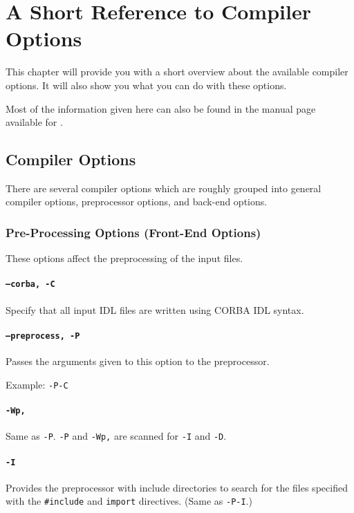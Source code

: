 \chapter{A Short Reference to Compiler Options}

This chapter will provide you with a short overview about the available
compiler options. It will also show you what you can do with these 
options.

Most of the information given here can also be found in the manual
page available for \dice{}.

\section{Compiler Options}
There are several compiler options which are roughly grouped
into general compiler options, preprocessor options, and back-end
options.

\subsection{Pre-Processing Options (Front-End Options)}
These options affect the preprocessing of the input files.

\subsubsection{{\tt --corba, -C}}
Specify that all input IDL files are written using CORBA IDL
syntax.

\subsubsection{{\tt --preprocess, -P}}
Passes the arguments given to this option to the preprocessor.

Example: \verb|-P-C|

\subsubsection{{\tt -Wp,}}
Same as {\tt -P}. {\tt -P} and {\tt -Wp,} are scanned for
{\tt -I} and {\tt -D}.

\subsubsection{{\tt -I}}
Provides the preprocessor with include directories to search
for the files specified with the \verb|#include| and \verb|import|
directives. (Same as {\tt -P-I}.)

